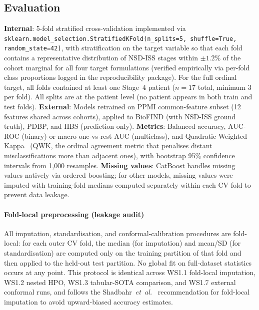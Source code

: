 \subsection{Evaluation}
\label{p1:sec:methods:evaluation}
\textbf{Internal}: 5-fold stratified cross-validation implemented via \texttt{sklearn.model\_selection.StratifiedKFold(n\_splits=5, shuffle=True, random\_state=42)}, with stratification on the target variable so that each fold contains a representative distribution of NSD-ISS stages within $\pm 1.2\%$ of the cohort marginal for all four target formulations (verified empirically via per-fold class proportions logged in the reproducibility package). For the full ordinal target, all folds contained at least one Stage~4 patient ($n{=}17$ total, minimum 3 per fold). All splits are at the patient level (no patient appears in both train and test folds).
\textbf{External}: Models retrained on PPMI common-feature subset (12 features shared across cohorts), applied to BioFIND (with NSD-ISS ground truth), PDBP, and HBS (prediction only).
\textbf{Metrics}: Balanced accuracy, AUC-ROC (binary) or macro one-vs-rest AUC (multiclass), and Quadratic Weighted Kappa~\cite{cohen1968} (QWK, the ordinal agreement metric that penalises distant misclassifications more than adjacent ones), with bootstrap 95\% confidence intervals from 1{,}000 resamples.
\textbf{Missing values}: CatBoost handles missing values natively via ordered boosting; for other models, missing values were imputed with training-fold medians computed separately within each CV fold to prevent data leakage.

\paragraph*{Fold-local preprocessing (leakage audit)} All imputation, standardisation, and conformal-calibration procedures are fold-local: for each outer CV fold, the median (for imputation) and mean/SD (for standardisation) are computed only on the training partition of that fold and then applied to the held-out test partition. No global fit on full-dataset statistics occurs at any point. This protocol is identical across WS1.1 fold-local imputation, WS1.2 nested HPO, WS1.3 tabular-SOTA comparison, and WS1.7 external conformal runs, and follows the Shadbahr~\textit{et~al.}~\cite{shadbahr2023imputation} recommendation for fold-local imputation to avoid upward-biased accuracy estimates.

